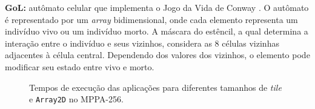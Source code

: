\documentclass[12pt]{article}
\newcommand{\mppa}{MPPA-256\xspace}
\begin{document}
\textbf{GoL:} autômato celular que implementa o Jogo da Vida de Conway
\cite{gardner70}. O autômato é representado por um \textit{array} bidimensional,
onde cada elemento representa um indivíduo vivo ou um indivíduo morto. A máscara
do estêncil, a qual determina a interação entre o indivíduo e seus vizinhos,
considera as $8$ células vizinhas adjacentes à célula central. Dependendo dos
valores dos vizinhos, o elemento pode modificar seu estado entre vivo e
morto.\\

\begin{figure}[t]
	\centering
	\qquad
    \qquad
	\caption{Tempos de execução das aplicações para diferentes tamanhos de \textit{tile} e \texttt{Array2D} no \mppa.}
	\label{fig:timeBox}
\end{figure}
\end{document}
